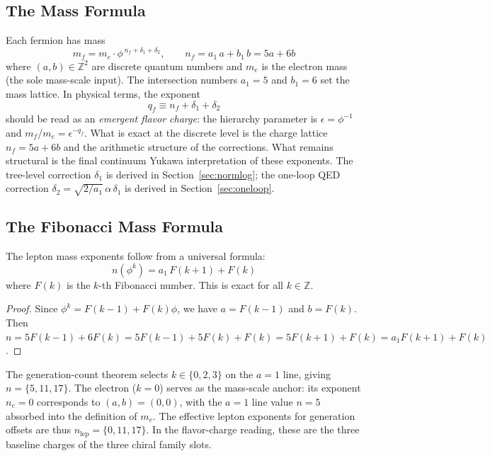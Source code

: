 \documentclass[12pt,a4paper]{article}
\theoremstyle{definition}
\begin{document}
\subsection{The Mass Formula}

Each fermion has mass
\begin{equation}
\boxed{m_f = m_e \cdot \phi^{\,n_f + \delta_1 + \delta_2}, \qquad n_f = a_1\,a + b_1\,b = 5a + 6b}
\label{eq:mass_formula}
\end{equation}
where $(a,b) \in \mathbb{Z}^2$ are discrete quantum numbers and $m_e$ is the electron mass (the sole mass-scale input).  The intersection numbers $a_1 = 5$ and $b_1 = 6$ set the mass lattice.  In physical terms, the exponent
\[
q_f \equiv n_f + \delta_1 + \delta_2
\]
should be read as an \emph{emergent flavor charge}: the hierarchy parameter is $\epsilon = \phi^{-1}$ and $m_f/m_e = \epsilon^{-q_f}$.  What is exact at the discrete level is the charge lattice $n_f = 5a+6b$ and the arithmetic structure of the corrections.  What remains structural is the final continuum Yukawa interpretation of these exponents.  The tree-level correction $\delta_1$ is derived in Section~\ref{sec:normlog}; the one-loop QED correction $\delta_2 = \sqrt{2/a_1}\,\alpha\,\delta_1$ is derived in Section~\ref{sec:oneloop}.

\subsection{The Fibonacci Mass Formula}

The lepton mass exponents follow from a universal formula:
\begin{equation}
\boxed{n(\phi^k) = a_1\,F(k+1) + F(k)}
\label{eq:fibonacci_mass}
\end{equation}
where $F(k)$ is the $k$-th Fibonacci number. This is exact for all $k \in \mathbb{Z}$.

\begin{proof}
Since $\phi^k = F(k-1) + F(k)\phi$, we have $a = F(k-1)$ and $b = F(k)$. Then $n = 5F(k-1) + 6F(k) = 5F(k-1) + 5F(k) + F(k) = 5F(k+1) + F(k) = a_1 F(k+1) + F(k)$.
\end{proof}

The generation-count theorem selects $k \in \{0, 2, 3\}$ on the $a = 1$ line, giving $n = \{5, 11, 17\}$. The electron ($k = 0$) serves as the mass-scale anchor: its exponent $n_e = 0$ corresponds to $(a,b) = (0,0)$, with the $a = 1$ line value $n = 5$ absorbed into the definition of $m_e$. The effective lepton exponents for generation offsets are thus $n_{\text{lep}} = \{0, 11, 17\}$.  In the flavor-charge reading, these are the three baseline charges of the three chiral family slots.
\end{document}
